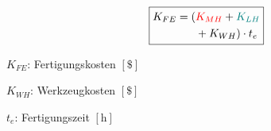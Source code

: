 \begin{tiny}
\begin{minipage}{0.5\linewidth}
    \[
    \boxed{        
        \begin{aligned}
            K_{FE} = (&\textcolor{red} {K_{MH}} + \textcolor{teal}{K_{LH}} \\
            &+ K_{WH}) \cdot t_e
        \end{aligned}
    }
    \]
    \end{minipage}
    \begin{minipage}{0.5\linewidth}
            \item $K_{FE}$: Fertigungskosten $\left[\$\right]$
            \item $K_{WH}$: Werkzeugkosten $\left[\$\right]$
            \item $t_e$: Fertigungszeit $\left[\text{h}\right]$
    \end{minipage}
    \vspace{1mm}
\end{tiny}

